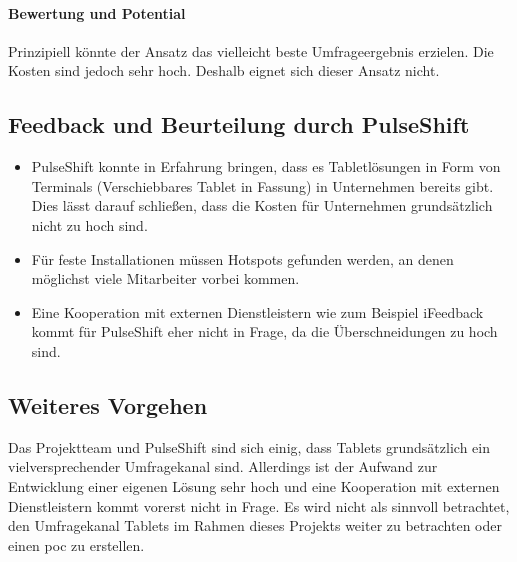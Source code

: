 \paragraph{Bewertung und Potential}

Prinzipiell könnte der Ansatz das vielleicht beste Umfrageergebnis erzielen. Die Kosten sind jedoch sehr hoch. Deshalb eignet sich dieser Ansatz nicht.

\subsection{Feedback und Beurteilung durch PulseShift}

\begin{itemize}
\item PulseShift konnte in Erfahrung bringen, dass es Tabletlösungen in Form von Terminals (Verschiebbares Tablet in Fassung) in Unternehmen bereits gibt. Dies lässt darauf schließen, dass die Kosten für Unternehmen grundsätzlich nicht zu hoch sind.
\item Für feste Installationen müssen Hotspots gefunden werden, an denen möglichst viele Mitarbeiter vorbei kommen.
\item Eine Kooperation mit externen Dienstleistern wie zum Beispiel iFeedback kommt für PulseShift eher nicht in Frage, da die Überschneidungen zu hoch sind.
\end{itemize}

\subsection{Weiteres Vorgehen}

Das Projektteam und PulseShift sind sich einig, dass Tablets grundsätzlich ein vielversprechender Umfragekanal sind. Allerdings ist der Aufwand zur Entwicklung einer eigenen Lösung sehr hoch und eine Kooperation mit externen Dienstleistern kommt vorerst nicht in Frage. Es wird nicht als sinnvoll betrachtet, den Umfragekanal Tablets im Rahmen dieses Projekts weiter zu betrachten oder einen \gls{poc} zu erstellen.
